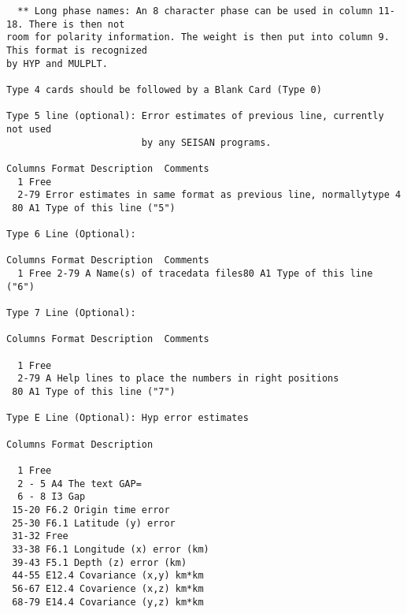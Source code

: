 \begin{verbatim}
  ** Long phase names: An 8 character phase can be used in column 11-18. There is then not
room for polarity information. The weight is then put into column 9. This format is recognized
by HYP and MULPLT. 

Type 4 cards should be followed by a Blank Card (Type 0) 

Type 5 line (optional): Error estimates of previous line, currently not used
                        by any SEISAN programs. 

Columns Format Description 	Comments 
  1 Free
  2-79 Error estimates in same format as previous line, normallytype 4
 80 A1 Type of this line ("5") 

Type 6 Line (Optional): 

Columns Format Description 	Comments 
  1 Free 2-79 A Name(s) of tracedata files80 A1 Type of this line ("6") 

Type 7 Line (Optional): 
  
Columns Format Description 	Comments 

  1 Free
  2-79 A Help lines to place the numbers in right positions
 80 A1 Type of this line ("7") 

Type E Line (Optional): Hyp error estimates 

Columns Format Description

  1 Free
  2 - 5 A4 The text GAP= 
  6 - 8 I3 Gap
 15-20 F6.2 Origin time error
 25-30 F6.1 Latitude (y) error
 31-32 Free
 33-38 F6.1 Longitude (x) error (km)
 39-43 F5.1 Depth (z) error (km)
 44-55 E12.4 Covariance (x,y) km*km
 56-67 E12.4 Covarience (x,z) km*km
 68-79 E14.4 Covariance (y,z) km*km 

\end{verbatim}
%
%
%
%
